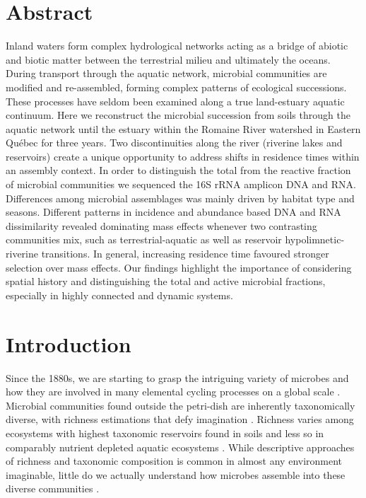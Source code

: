\documentclass[12pt,a4paper]{article} %
\begin{document}
\section*{Abstract} %
Inland waters form complex hydrological networks acting as a bridge of abiotic and biotic matter between the terrestrial milieu and ultimately the oceans. During transport through the aquatic network, microbial communities are modified and re-assembled, forming complex patterns of ecological successions. These processes have seldom been examined along a true land-estuary aquatic continuum. Here we reconstruct the microbial succession from soils through the aquatic network until the estuary within the Romaine River watershed in Eastern Québec for three years. Two discontinuities along the river (riverine lakes and reservoirs) create a unique opportunity to address shifts in residence times within an assembly context. In order to distinguish the total from the reactive fraction of microbial communities we sequenced the 16S rRNA amplicon DNA and RNA. Differences among microbial assemblages was mainly driven by habitat type and seasons. Different patterns in incidence and abundance based DNA and RNA dissimilarity revealed dominating mass effects whenever two contrasting communities mix, such as terrestrial-aquatic as well as reservoir hypolimnetic-riverine transitions. In general, increasing residence time favoured stronger selection over mass effects. Our findings highlight the importance of considering spatial history and distinguishing the total and active microbial fractions, especially in highly connected and dynamic systems.


\setlength{\parindent}{1cm}
\section*{Introduction}
Since the 1880s, we are starting to grasp the intriguing variety of microbes and how they are involved in many elemental cycling processes on a global scale \citep{Caumette2015}. Microbial communities found outside the petri-dish are inherently taxonomically diverse, with richness estimations that defy imagination \citep{Thompson2017, Louca2019}. Richness varies among ecosystems with highest taxonomic reservoirs found in soils and less so in comparably nutrient depleted aquatic ecosystems \citep{Thompson2017}. While descriptive approaches of richness and taxonomic composition is common in almost any environment imaginable, little do we actually understand how microbes assemble into these diverse communities \citep{Shade2017a, Shade2018}.
\end{document}
